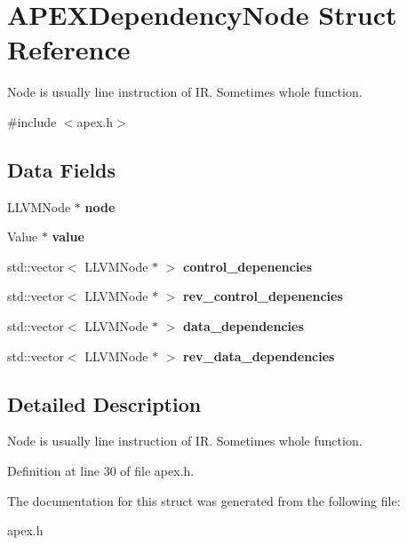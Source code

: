 \section{A\+P\+E\+X\+Dependency\+Node Struct Reference}
\label{structAPEXDependencyNode}


Node is usually line instruction of IR. Sometimes whole function.  




{\ttfamily \#include $<$apex.\+h$>$}

\subsection*{Data Fields}
\begin{DoxyCompactItemize}
\item 
\mbox{\label{structAPEXDependencyNode_a970e7a2fef904e104bff4c2fc5ff2cb1}} 
L\+L\+V\+M\+Node $\ast$ {\bfseries node}
\item 
\mbox{\label{structAPEXDependencyNode_a8b3b641572bf365c4f731fc83b169984}} 
Value $\ast$ {\bfseries value}
\item 
\mbox{\label{structAPEXDependencyNode_a6c402ac3d515fb024c9d8e08aced4f5c}} 
std\+::vector$<$ L\+L\+V\+M\+Node $\ast$ $>$ {\bfseries control\+\_\+depenencies}
\item 
\mbox{\label{structAPEXDependencyNode_ae526db6103f708c8cfacbb0af242c65f}} 
std\+::vector$<$ L\+L\+V\+M\+Node $\ast$ $>$ {\bfseries rev\+\_\+control\+\_\+depenencies}
\item 
\mbox{\label{structAPEXDependencyNode_ade99c6315545e206d562789348540cc0}} 
std\+::vector$<$ L\+L\+V\+M\+Node $\ast$ $>$ {\bfseries data\+\_\+dependencies}
\item 
\mbox{\label{structAPEXDependencyNode_abcf07bec655009d666e6f2c1163f4dcb}} 
std\+::vector$<$ L\+L\+V\+M\+Node $\ast$ $>$ {\bfseries rev\+\_\+data\+\_\+dependencies}
\end{DoxyCompactItemize}


\subsection{Detailed Description}
Node is usually line instruction of IR. Sometimes whole function. 

Definition at line 30 of file apex.\+h.



The documentation for this struct was generated from the following file\+:\begin{DoxyCompactItemize}
\item 
apex.\+h\end{DoxyCompactItemize}
